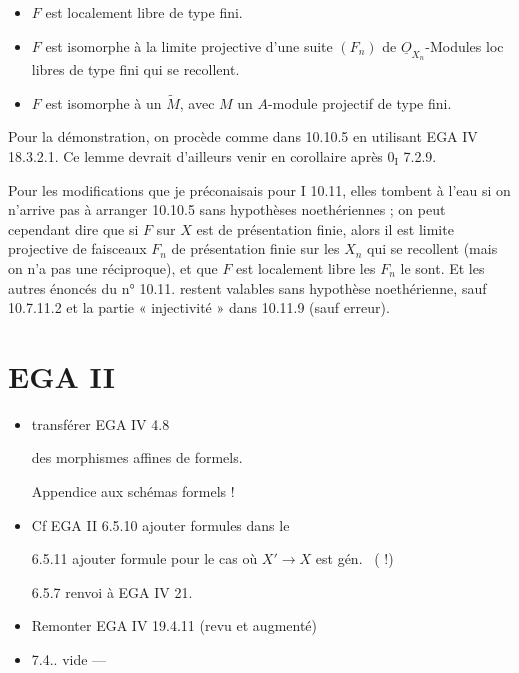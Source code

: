 \documentclass[11pt,a4paper]{article}
\begin{document}
\begin{itemize}
\item[a)] $F$ est localement libre de type fini.
\item[b)] $F$ est isomorphe à la limite projective d'une suite $(F_n)$ de
$\underline{O}_{X_n}$-Modules loc libres de type fini qui se recollent.
\item[c)] $F$ est isomorphe à un $\widetilde{M}$, avec $M$ un $A$-module
projectif de type fini.
\end{itemize}

Pour la démonstration, on procède comme dans 10.10.5 en utilisant EGA IV
18.3.2.1. Ce lemme devrait d'ailleurs venir en corollaire après
$0_{\mathrm{I}}$ 7.2.9.

Pour les modifications que je préconaisais pour I 10.11, elles tombent à
l'eau si on n'arrive pas à arranger 10.10.5 sans hypothèses noethériennes ;
on peut cependant dire que si $F$ sur $X$ est de présentation finie, alors il
est limite projective de faisceaux $F_n$ de présentation finie sur les $X_n$
qui se recollent (mais on n'a pas une réciproque), et que $F$ est localement
libre  les $F_n$ le sont. Et les autres énoncés du n°
10.11. restent valables sans hypothèse noethérienne, sauf 10.7.11.2 et la
partie « injectivité » dans 10.11.9 (sauf erreur).

\section*{EGA II}




\begin{itemize}
\item[(a)] transférer EGA IV 4.8

  des morphismes affines de
 formels.

Appendice  \ill{} aux schémas formels !

\item[(b)] Cf EGA II 6.5.10 \quad ajouter formules dans le \ill{}

6.5.11 \quad ajouter formule pour le cas où $X' \to X$ est gén.\
 (\ill{}  \ill{} !)

6.5.7 \quad renvoi à EGA IV 21.

\item[(c)] Remonter EGA IV 19.4.11 (revu et augmenté)

\item[(d)] 7.4.. \quad {} \ill{} vide ---
\end{itemize}
\end{document}

